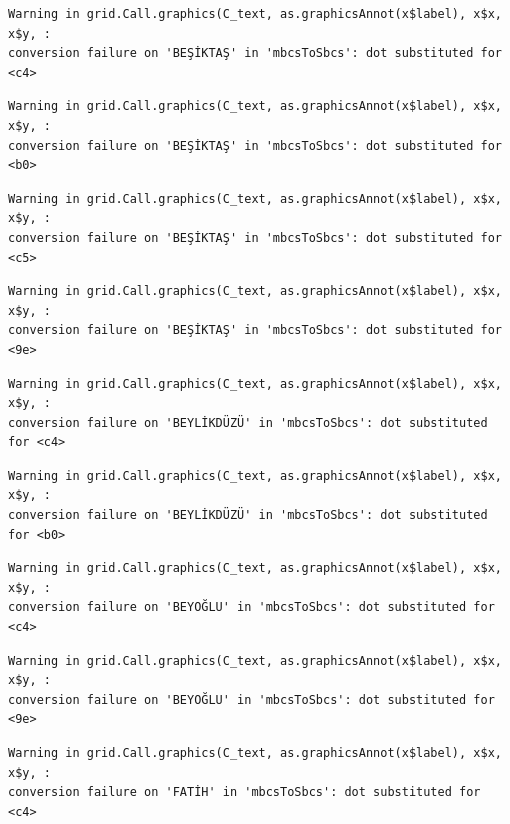 \documentclass[
  11pt,
  a4paper,
  DIV=11,
  numbers=noendperiod]{scrartcl}
\begin{document}
\begin{verbatim}
Warning in grid.Call.graphics(C_text, as.graphicsAnnot(x$label), x$x, x$y, :
conversion failure on 'BEŞİKTAŞ' in 'mbcsToSbcs': dot substituted for <c4>
\end{verbatim}

\begin{verbatim}
Warning in grid.Call.graphics(C_text, as.graphicsAnnot(x$label), x$x, x$y, :
conversion failure on 'BEŞİKTAŞ' in 'mbcsToSbcs': dot substituted for <b0>
\end{verbatim}

\begin{verbatim}
Warning in grid.Call.graphics(C_text, as.graphicsAnnot(x$label), x$x, x$y, :
conversion failure on 'BEŞİKTAŞ' in 'mbcsToSbcs': dot substituted for <c5>
\end{verbatim}

\begin{verbatim}
Warning in grid.Call.graphics(C_text, as.graphicsAnnot(x$label), x$x, x$y, :
conversion failure on 'BEŞİKTAŞ' in 'mbcsToSbcs': dot substituted for <9e>
\end{verbatim}

\begin{verbatim}
Warning in grid.Call.graphics(C_text, as.graphicsAnnot(x$label), x$x, x$y, :
conversion failure on 'BEYLİKDÜZÜ' in 'mbcsToSbcs': dot substituted for <c4>
\end{verbatim}

\begin{verbatim}
Warning in grid.Call.graphics(C_text, as.graphicsAnnot(x$label), x$x, x$y, :
conversion failure on 'BEYLİKDÜZÜ' in 'mbcsToSbcs': dot substituted for <b0>
\end{verbatim}

\begin{verbatim}
Warning in grid.Call.graphics(C_text, as.graphicsAnnot(x$label), x$x, x$y, :
conversion failure on 'BEYOĞLU' in 'mbcsToSbcs': dot substituted for <c4>
\end{verbatim}

\begin{verbatim}
Warning in grid.Call.graphics(C_text, as.graphicsAnnot(x$label), x$x, x$y, :
conversion failure on 'BEYOĞLU' in 'mbcsToSbcs': dot substituted for <9e>
\end{verbatim}

\begin{verbatim}
Warning in grid.Call.graphics(C_text, as.graphicsAnnot(x$label), x$x, x$y, :
conversion failure on 'FATİH' in 'mbcsToSbcs': dot substituted for <c4>
\end{verbatim}
\end{document}
